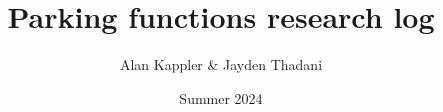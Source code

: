 \documentclass[titlepage,12pt]{article}
\title{Parking functions research log}
\author{Alan Kappler \& Jayden Thadani}
\date{Summer 2024}
\theoremstyle{definition}
\theoremstyle{remark}
\begin{document}
\maketitle













\nocite{*}


\end{document}
